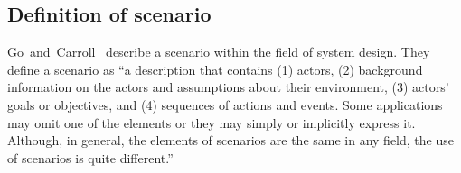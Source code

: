 \subsection{Definition of scenario}
\label{sec:scenario definition}



Go~and~Carroll~\cite{go2004blind} describe a scenario within the field of system design. They define a scenario as ``a description that contains (1) actors, (2) background information on the actors and assumptions about their environment, (3) actors' goals or objectives, and (4) sequences of actions and events. Some applications may omit one of the elements or they may simply or implicitly express it. Although, in general, the elements of scenarios are the same in any field, the use of scenarios is quite different.'' 


